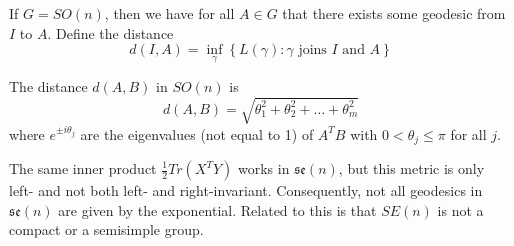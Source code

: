 If $G=SO(n)$, then we have for all $A\in G$ that there exists some geodesic from $I$ to $A$.  Define the distance $$d(I,A)=\inf\limits_\gamma\left\{ L(\gamma) : \gamma \text{ joins } I\text{ and } A    \right\}$$

The distance $d(A,B)$ in $SO(n)$ is 
$$d(A,B) = \sqrt{\theta_1^2 + \theta_2^2 + \dots + \theta_m^2}$$ where $e^{\pm i \theta_j}$ are the eigenvalues (not equal to 1) of $A^TB$ with $0<\theta_j\leq \pi$ for all $j$.

The same inner product $\frac{1}{2}Tr(X^TY)$ works in $\mathfrak{se}(n)$, but this metric is only left- and not both left- and right-invariant.  Consequently, not all geodesics in $\mathfrak{se}(n)$ are given by the exponential.  Related to this is that $SE(n)$ is not a compact or a semisimple group.